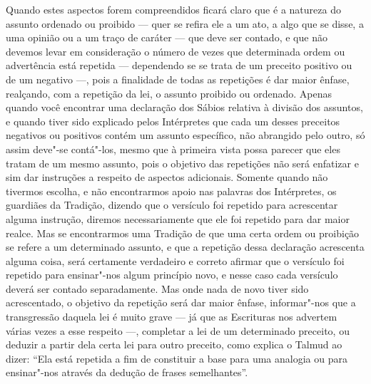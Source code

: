 Quando estes aspectos forem compreendidos ficará claro que é a natureza
do assunto ordenado ou proibido --- quer se refira ele a um ato, a algo
que se disse, a uma opinião ou a um traço de caráter --- que deve ser
contado, e que não devemos levar em consideração o número de vezes que
determinada ordem ou advertência está repetida --- dependendo se se
trata de um preceito positivo ou de um negativo ---, pois a finalidade
de todas as repetições é dar maior ênfase, realçando, com a repetição da
lei, o assunto proibido ou ordenado. Apenas quando você encontrar uma
declaração dos Sábios relativa à divisão dos assuntos, e quando tiver
sido explicado pelos Intérpretes que cada um desses preceitos negativos
ou positivos contém um assunto específico, não abrangido pelo outro, só
assim deve"-se contá"-los, mesmo que à primeira vista possa parecer que
eles tratam de um mesmo assunto, pois o objetivo das repetições não
será enfatizar e sim dar instruções a respeito de aspectos adicionais.
Somente quando não tivermos escolha, e não encontrarmos apoio nas
palavras dos Intérpretes, os guardiães da Tradição, dizendo que o
versículo foi repetido para acrescentar alguma instrução, diremos
necessariamente que ele foi repetido para dar maior realce. Mas se
encontrarmos uma Tradição de que uma certa ordem ou proibição se refere
a um determinado assunto, e que a repetição dessa declaração acrescenta
alguma coisa, será certamente verdadeiro e correto afirmar que o
versículo foi repetido para ensinar"-nos algum princípio novo, e nesse
caso cada versículo deverá ser contado separadamente. Mas onde nada de
novo tiver sido acrescentado, o objetivo da repetição será dar maior
ênfase, informar"-nos que a transgressão daquela lei é muito grave --- já
que as Escrituras nos advertem várias vezes a esse respeito ---,
completar a lei de um determinado preceito, ou deduzir a partir dela
certa lei para outro preceito, como explica o Talmud\starr{} ao dizer: ``Ela
está repetida a fim de constituir a base para uma analogia ou para
ensinar"-nos através da dedução de frases semelhantes''.

